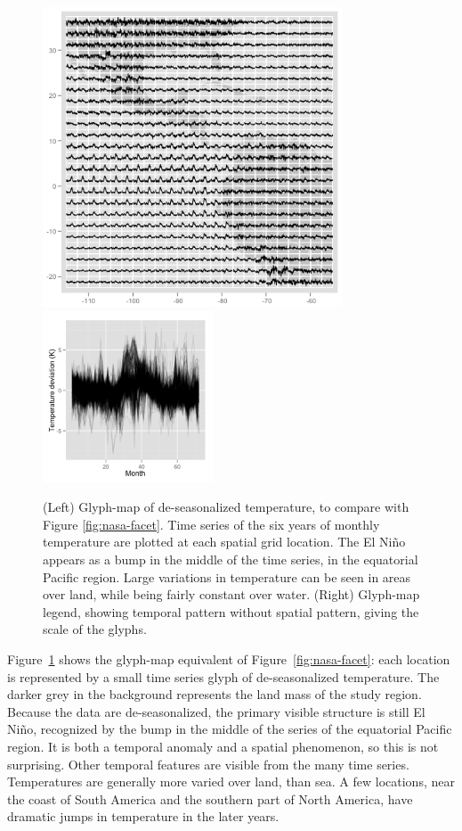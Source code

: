 \documentclass[oneside]{article}
\begin{document}
\begin{figure}[htbp]
  \centering
  \includegraphics[width=3.5in]{nasa-deseas-glyph}
  \includegraphics[width=2in]{nasa-deseas-glyph-leg}
  \caption{(Left) Glyph-map of de-seasonalized temperature, to compare with Figure \ref{fig:nasa-facet}. Time series of the six years of monthly temperature are plotted at each spatial grid location. The El Ni\~no appears as a bump in the middle of the time series, in the equatorial Pacific region. Large variations in temperature can be seen in areas over land, while being fairly constant over water. (Right) Glyph-map legend, showing temporal pattern without spatial pattern, giving the scale of the glyphs.}
  \label{fig:nasa-glyph}
\end{figure}

Figure~\ref{fig:nasa-glyph} shows the glyph-map equivalent of Figure~\ref{fig:nasa-facet}: each location is represented by a small time series glyph of de-seasonalized temperature. The darker grey in the background represents the land mass of the study region. Because the data are de-seasonalized, the primary visible structure is still El Ni\~no, recognized by the bump in the middle of the series of the equatorial Pacific region. It is both a temporal anomaly and a spatial phenomenon, so this is not surprising. Other temporal features are visible from the many time series. Temperatures are generally more varied over land, than sea. A few locations, near the coast of South America and the southern part of North America, have dramatic jumps in temperature in the later years.
\end{document}
